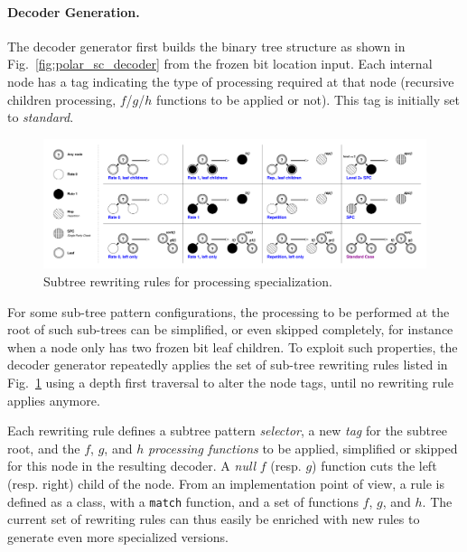 \paragraph{Decoder Generation.}

The decoder generator first builds the binary tree structure as shown in
Fig.~\ref{fig:polar_sc_decoder} from the frozen bit location input. Each
internal node has a tag indicating the type of processing required at that node
(recursive children processing, $f$/$g$/$h$ functions to be applied or not).
This tag is initially set to \emph{standard}.

\begin{figure}
  \centering
  \includegraphics[width=1.0\textwidth]{polar/patterns}
  \caption{Subtree rewriting rules for processing specialization.}
  \label{fig:polar_patterns}
\end{figure}

For some sub-tree pattern configurations, the processing to be performed at the
root of such sub-trees can be simplified, or even skipped completely, for
instance when a node only has two frozen bit leaf children. To exploit such
properties, the decoder generator repeatedly applies the set of sub-tree
rewriting rules listed in Fig.~\ref{fig:polar_patterns} using a depth first
traversal to alter the node tags, until no rewriting rule applies anymore.

Each rewriting rule defines a subtree pattern \emph{selector}, a new \emph{tag}
for the subtree root, and the $f$, $g$, and $h$ \emph{processing functions} to
be applied, simplified or skipped for this node in the resulting decoder. A
\emph{null} $f$ (resp. $g$) function cuts the left (resp. right) child of the
node. From an implementation point of view, a rule is defined as a class, with a
\texttt{match} function, and a set of functions $f$, $g$, and $h$. The current
set of rewriting rules can thus easily be enriched with new rules to generate
even more specialized versions.


